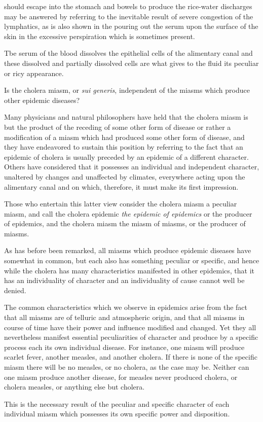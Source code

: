 should escape into the stomach and bowels to produce the rice-water
discharges may be answered by referring to the inevitable result of severe
congestion of the lymphatics, as is also shown in the pouring out the
serum upon the surface of the skin in the excessive perspiration which
is sometimes present.

Tbe serum of the blood dissolves the epithelial cells of the alimentary
canal and these dissolved and partially dissolved cells are what gives to
the fluid its peculiar or ricy appearance.

\vspace{\baselineskip}

Is the cholera miasm, or \emph{sui generis}, independent of the miasms which
produce other epidemic diseases?

Many physicians and natural philosophers have held that the cholera
miasm is but the product of the receding of some other form of disease
or rather a modification of a miasm which had produced some other
form of disease, and they have endeavored to sustain this position by
referring to the fact that an epidemic of cholera is usually preceded by
an epidemic of a different character. Others have considered that it
possesses an individual and independent character, unaltered by changes
and unaffected by climates, everywhere acting upon the alimentary canal
and on which, therefore, it must make its first impression.

Those who entertain this latter view consider the cholera miasm a
peculiar miasm, and call the cholera epidemic \emph{the epidemic of epidemics}
or the producer of epidemics, and the cholera miasm the miasm of
miasms, or the producer of miasms.

As has before been remarked, all miasms which produce epidemic
diseases have somewhat in common, but each also has something peculiar
or specific, and hence while the cholera has many characteristics
manifested in other epidemics, that it has an individuality of character
and an individuality of cause cannot well be denied.

The common characteristics which we observe in epidemics arise
from the fact that all miasms are of telluric and atmospheric origin,
and that all miasms in course of time have their power and influence
modified and changed. Yet they all nevertheless manifest essential
peculiarities of character and produce by a specific process each its own
individual disease. For instance, one miasm will produce scarlet fever,
another measles, and another cholera. If there is none of the specific
miasm there will be no measles, or no cholera, as the case may be.
Neither can one miasm produce another disease, for measles never produced
cholera, or cholera measles, or anything else but cholera.

This is the necessary result of the peculiar and specific character of
each individual miasm which possesses its own specific power and disposition.\endinput